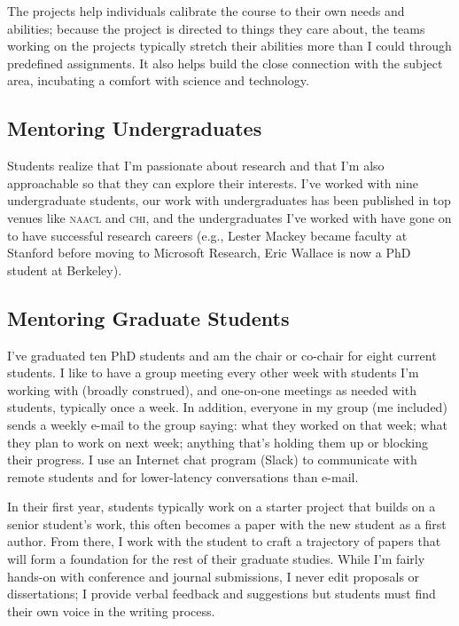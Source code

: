 \documentclass[11pt]{amsart}
\newcommand{\abr}[1]{\textsc{#1}}
\begin{document}
The projects help individuals calibrate the course to their own needs
and abilities; because the project is directed to things they
care about, the teams working on the projects typically stretch their
abilities more than I could through predefined assignments.  It also
helps build the close connection with the subject area, incubating a
comfort with science and technology.

\subsection{Mentoring Undergraduates}

Students realize that I'm passionate about research and that I'm also
approachable so that they can explore their interests. I've worked with nine
undergraduate students, our work with undergraduates has been published in top
venues like \abr{naacl} and \abr{chi}, and the undergraduates I've worked with
have gone on to have successful research careers (e.g., Lester Mackey became
faculty at Stanford before moving to Microsoft Research, Eric Wallace is now a
PhD student at Berkeley).

\subsection{Mentoring Graduate Students}

I've graduated ten PhD students and am the chair or co-chair for
eight current students.  I like to have a group meeting every other
week with students I'm working with (broadly construed), and
one-on-one meetings as needed with students, typically once a week. In
addition, everyone in my group (me included) sends a weekly e-mail to
the group saying: what they worked on that week; what they plan to work
on next week; anything that's holding them up or blocking their
progress. I use an Internet chat program (Slack) to communicate with remote
students and for lower-latency conversations than e-mail.

In their first year, students typically work on a starter project that
builds on a senior student's work, this often becomes a paper with the
new student as a first author.  From there, I work with the student to
craft a trajectory of papers that will form a foundation for the rest
of their graduate studies.  While I'm fairly hands-on with conference
and journal submissions, I never edit proposals or dissertations; I
provide verbal feedback and suggestions but students must find their
own voice in the writing process.  
\end{document}
